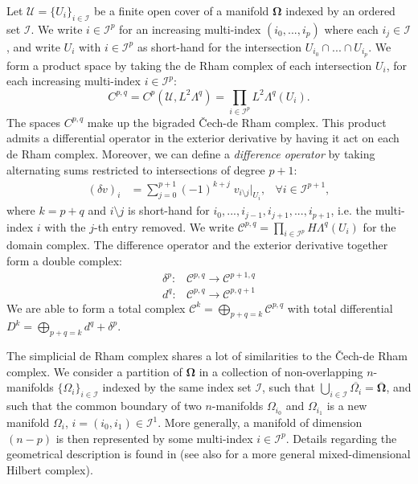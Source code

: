 \documentclass[reqno]{amsart}
\numberwithin{equation}{section}
\theoremstyle{definition}
\newcommand{\Cc}{\mathcal{C}}
\newcommand{\Ic}{\mathcal{I}}
\newcommand{\Uc}{\mathcal{U}}
\begin{document}
Let $\Uc = \{U_i\}_{i \in \Ic}$ be a finite open cover of a manifold $\mathbf{\Omega}$ indexed by an ordered set $\Ic$. We write $i \in \Ic^p$ for an increasing multi-index $(i_0, ..., i_p)$ where each $i_j \in \Ic$, and write $U_i$ with $i \in \Ic^p$ as short-hand for the intersection $U_{i_0} \cap ... \cap U_{i_p}$. We form a product space by taking the de Rham complex of each intersection $U_i$, for each increasing multi-index $i \in \Ic^p$:
\begin{equation}\label{eq: bigraded CdR}
C^{p,q} = C^p(\Uc, L^2\Lambda^q) = \prod_{i \in \Ic^p} L^2\Lambda^q(U_i).
\end{equation}
The spaces $C^{p,q}$ make up the bigraded \v{C}ech-de Rham complex. This product admits a differential operator in the exterior derivative by having it act on each de Rham complex. Moreover, we can define a \emph{difference operator} by taking alternating sums restricted to intersections of degree $p+1$:
\begin{align}
(\delta v)_i &=  \sum_{j=0}^{p+1} (-1)^{k+j}  \; v_{i \setminus j}|_{U_i}, &
\forall i \in \mathcal{I}^{p+1},
\end{align}
where $k=p+q$ and $i \setminus j$ is short-hand for $i_0, ..., i_{j-1}, i_{j+1}, ..., i_{p+1}$, i.e. the multi-index $i$ with the $j$-th entry removed. We write $\Cc^{p,q} = \prod_{i \in \Ic^p} H\Lambda^q(U_i)$ for the domain complex. The difference operator and the exterior derivative together  form a double complex:
\begin{align}
\delta^p:& \Cc^{p,q} \to \Cc^{p+1, q} \\
d^q:& \Cc^{p,q} \to \Cc^{p,q+1}
\end{align}
We are able to form a total complex $\Cc^k = \bigoplus_{p+q=k} \Cc^{p,q}$ with total differential $D^k = \bigoplus_{p+q=k} d^q + \delta^p$.

The simplicial de Rham complex shares a lot of similarities to the \v{C}ech-de Rham complex. We consider a partition of $\mathbf{\Omega}$ in a collection of non-overlapping $n$-manifolds $\{\Omega_i\}_{i \in \Ic}$ indexed by the same index set $\Ic$, such that $\bigcup_{i\in\Ic} \overline{\Omega_i}=\overline{\mathbf{\Omega}}$, and such that the common boundary of two $n$-manifolds $\Omega_{i_0}$ and $\Omega_{i_1}$ is a new manifold $\Omega_i$, $i = (i_0, i_1) \in \Ic^1$. More generally, a manifold of dimension $(n-p)$ is then represented by some multi-index $i \in \Ic^p$. Details regarding the geometrical description is found in \cite{holmen2024injective} (see also \cite{mdG} for a more general mixed-dimensional Hilbert complex).
\end{document}
